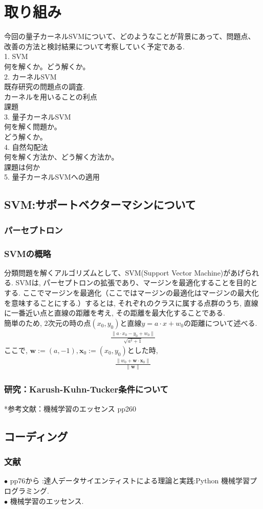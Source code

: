 \documentclass{jsarticle}
\theoremstyle{definition}
\begin{document}
\section{取り組み}
今回の量子カーネルSVMについて、どのようなことが背景にあって、問題点、改善の方法と検討結果について考察していく予定である. \\
1. SVM\\
	何を解くか。どう解くか。\\
2. カーネルSVM\\
	既存研究の問題点の調査.\\
	カーネルを用いることの利点\\
	課題\\
3. 量子カーネルSVM\\
	何を解く問題か。\\
	どう解くか。\\
4. 自然勾配法\\
	何を解く方法か、どう解く方法か。\\
	課題は何か\\
5. 量子カーネルSVMへの適用
\newpage
\subsection{SVM:サポートベクターマシンについて}
\subsubsection{パーセプトロン}
\subsubsection{SVMの概略}
分類問題を解くアルゴリズムとして、SVM(Support Vector Machine)があげられる. SVMは, パーセプトロンの拡張であり、マージンを最適化することを目的とする. ここでマージンを最適化（ここではマージンの最適化はマージンの最大化を意味することにする.）するとは, それぞれのクラスに属する点群のうち, 直線に一番近い点と直線の距離を考え, その距離を最大化することである.\\
簡単のため, $2$次元の時の点$(x_0, y_0)$と直線$y=a\cdot x +w_0 $の距離について述べる.
\begin{align}
\frac{ \| a\cdot x_0 - y_0+ w_0  \| }{\sqrt{a^2+1 }} 
\end{align}
ここで, $\mathbf{w}:=(a,-1), \mathbf{x}_0 :=(x_0, y_0) $とした時, 
\begin{align}
\frac{ \| w_0+  \mathbf{w} \cdot \mathbf{x}_0  \| }{\|\mathbf{w} \|}
\end{align}

\subsubsection{研究：Karush-Kuhn-Tucker条件について}
*参考文献：機械学習のエッセンス pp260
\subsection{コーディング}
\subsubsection{文献}
$\bullet$ pp76から :達人データサイエンティストによる理論と実践:Python 機械学習プログラミング. \\
$\bullet$ 機械学習のエッセンス.
\end{document}

